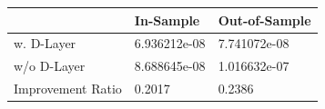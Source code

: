 \begin{tabular}{lll}
\toprule
 & In-Sample & Out-of-Sample \\
\midrule
w. D-Layer & 6.936212e-08 & 7.741072e-08 \\
w/o D-Layer & 8.688645e-08 & 1.016632e-07 \\
Improvement Ratio & 0.2017 & 0.2386 \\
\bottomrule
\end{tabular}
